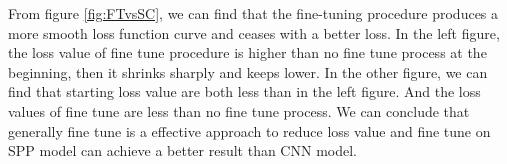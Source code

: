 From figure \ref{fig:FTvsSC}, we can find that the fine-tuning procedure produces a more smooth loss function curve and ceases with a better loss. In the left figure, the loss value of fine tune procedure is higher than no fine tune process at the beginning, then it shrinks sharply and keeps lower. In the other figure, we can find that starting loss value are both less than in the left figure. And the loss values of fine tune are less than no fine tune process. We can conclude that generally fine tune is a effective approach to reduce loss value and fine tune on SPP model can achieve a better result than CNN model.